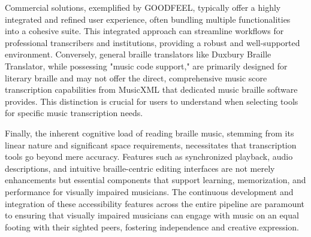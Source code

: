 Commercial solutions, exemplified by GOODFEEL, typically offer a highly integrated and refined user experience, often bundling multiple functionalities into a cohesive suite. This integrated approach can streamline workflows for professional transcribers and institutions, providing a robust and well-supported environment. Conversely, general braille translators like Duxbury Braille Translator, while possessing "music code support," are primarily designed for literary braille and may not offer the direct, comprehensive music score transcription capabilities from MusicXML that dedicated music braille software provides. This distinction is crucial for users to understand when selecting tools for specific music transcription needs.

Finally, the inherent cognitive load of reading braille music, stemming from its linear nature and significant space requirements, necessitates that transcription tools go beyond mere accuracy. Features such as synchronized playback, audio descriptions, and intuitive braille-centric editing interfaces are not merely enhancements but essential components that support learning, memorization, and performance for visually impaired musicians. The continuous development and integration of these accessibility features across the entire pipeline are paramount to ensuring that visually impaired musicians can engage with music on an equal footing with their sighted peers, fostering independence and creative expression.

